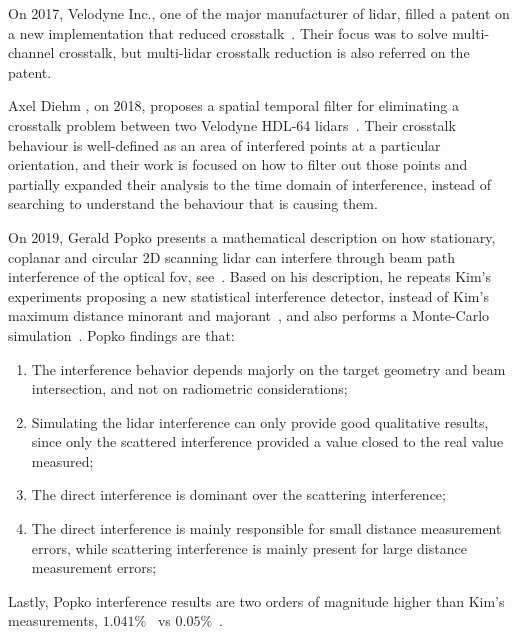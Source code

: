 On 2017, Velodyne Inc., one of the major manufacturer of \ac{lidar}, filled a patent on a new implementation that reduced crosstalk~\cite{Hall2017}. Their focus was to solve multi-channel crosstalk, but multi-\ac{lidar} crosstalk reduction is also referred on the patent.

Axel Diehm \etal, on 2018, proposes a spatial temporal filter for eliminating a crosstalk problem between two Velodyne HDL-64 \acp{lidar}~\cite{Hebel2018}. Their crosstalk behaviour is well-defined as an area of interfered points at a particular orientation, and their work is focused on how to filter out those points and partially expanded their analysis to the time domain of interference, instead of searching to understand the behaviour that is causing them.

On 2019, Gerald Popko \etal presents a mathematical description on how stationary, coplanar and circular 2D scanning \ac{lidar} can interfere through beam path interference of the optical \ac{fov}, see~\cite{Popko2019a}. Based on his description, he repeats Kim's \etal experiments proposing a new statistical interference detector, instead of Kim's maximum distance minorant and majorant~\cite{Kim2015a}, and also performs a Monte-Carlo simulation~\cite{Popko2019b}. Popko \etal findings are that:

\begin{enumerate}
	\item The interference behavior depends majorly on the target geometry and beam intersection, and not on radiometric considerations;
	\item Simulating the \ac{lidar} interference can only provide good qualitative results, since only the scattered interference provided a value closed to the real value measured;
	\item The direct interference is dominant over the scattering interference;
	\item The direct interference is mainly responsible for small distance measurement errors, while scattering interference is mainly present for large distance measurement errors;
\end{enumerate}

Lastly, Popko \etal interference results are two orders of magnitude higher than Kim's \etal measurements, $1.041 \%$~\cite{Popko2019b} vs $0.05\%$~\cite{Kim2015a}.

